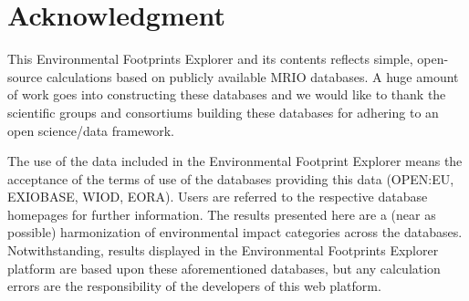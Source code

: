 \section*{Acknowledgment}

 This Environmental Footprints Explorer and its contents reflects simple, open-source calculations based on publicly available MRIO databases. A huge amount of work goes into constructing these databases and we would like to thank the scientific groups and consortiums building these databases for adhering to an open science/data framework.
 
 The use of the data included in the Environmental Footprint Explorer means the acceptance of the terms of use of the databases providing this data (OPEN:EU, EXIOBASE, WIOD, EORA). Users are referred to the respective database homepages for further information. The results presented here are a (near as possible) harmonization of environmental impact categories across the databases. Notwithstanding, results displayed in the Environmental Footprints Explorer platform are based upon these aforementioned databases, but any calculation errors are the responsibility of the developers of this web platform.
